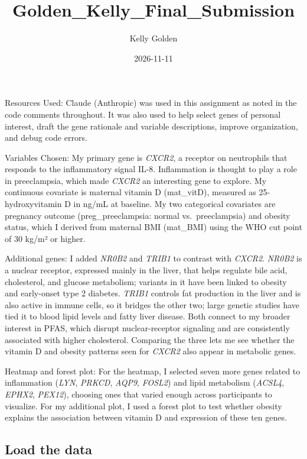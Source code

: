 \documentclass[
]{article}
\title{Golden\_Kelly\_Final\_Submission}
\author{Kelly Golden}
\date{2026-11-11}
\begin{document}
\maketitle

Resources Used: Claude (Anthropic) was used in this assignment as noted
in the code comments throughout. It was also used to help select genes
of personal interest, draft the gene rationale and variable
descriptions, improve organization, and debug code errors.

Variables Chosen: My primary gene is \emph{CXCR2}, a receptor on
neutrophils that responds to the inflammatory signal IL-8. Inflammation
is thought to play a role in preeclampsia, which made \emph{CXCR2} an
interesting gene to explore. My continuous covariate is maternal vitamin
D (mat\_vitD), measured as 25-hydroxyvitamin D in ng/mL at baseline. My
two categorical covariates are pregnancy outcome (preg\_preeclampsia:
normal vs.~preeclampsia) and obesity status, which I derived from
maternal BMI (mat\_BMI) using the WHO cut point of 30 kg/m² or higher.

Additional genes: I added \emph{NR0B2} and \emph{TRIB1} to contrast with
\emph{CXCR2}. \emph{NR0B2} is a nuclear receptor, expressed mainly in
the liver, that helps regulate bile acid, cholesterol, and glucose
metabolism; variants in it have been linked to obesity and early-onset
type 2 diabetes. \emph{TRIB1} controls fat production in the liver and
is also active in immune cells, so it bridges the other two; large
genetic studies have tied it to blood lipid levels and fatty liver
disease. Both connect to my broader interest in PFAS, which disrupt
nuclear-receptor signaling and are consistently associated with higher
cholesterol. Comparing the three lets me see whether the vitamin D and
obesity patterns seen for \emph{CXCR2} also appear in metabolic genes.

Heatmap and forest plot: For the heatmap, I selected seven more genes
related to inflammation (\emph{LYN}, \emph{PRKCD}, \emph{AQP9},
\emph{FOSL2}) and lipid metabolism (\emph{ACSL4}, \emph{EPHX2},
\emph{PEX12}), choosing ones that varied enough across participants to
visualize. For my additional plot, I used a forest plot to test whether
obesity explains the association between vitamin D and expression of
these ten genes.

\subsection{Load the data}\label{load-the-data}
\end{document}
